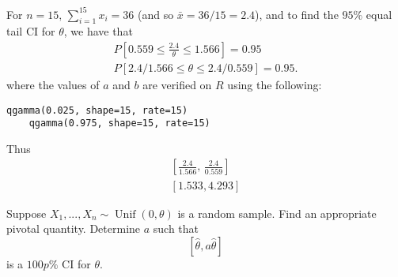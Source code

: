 \documentclass[notoc,notitlepage]{tufte-book}
\DeclareMathOperator{\Unif}{Unif }
\begin{document}
\begin{solution}
  For $n = 15, \, \sum_{i=1}^{15} x_i = 36$ (and so $\bar{x} = 36/15 = 2.4$), and to find the $95\%$ equal tail CI for $\theta$, we have that
  \begin{gather*}
    P\left[ 0.559 \leq \frac{2.4}{\theta} \leq 1.566 \right] = 0.95 \\
    P\left[ 2.4/1.566 \leq \theta \leq 2.4/0.559 \right] = 0.95.
  \end{gather*}
  where the values of $a$ and $b$ are verified on $R$ using the following:
  \begin{lstlisting}[caption=R interactive code to get $a$ and $b$]
    qgamma(0.025, shape=15, rate=15)
    qgamma(0.975, shape=15, rate=15)
  \end{lstlisting}
  Thus
  \begin{gather*}
    \left[ \frac{2.4}{1.566}, \, \frac{2.4}{0.559} \right] \\
    \left[ 1.533, 4.293 \right]
  \end{gather*}
\end{solution}

\begin{eg}
  Suppose $X_1, ..., X_n \sim \Unif(0, \theta)$ is a random sample. Find an appropriate pivotal quantity. Determine $a$ such that
  \begin{equation*}
    \left[ \hat{\theta}, a \hat{\theta} \right]
  \end{equation*}
  is a $100p\%$ CI for $\theta$.
\end{eg}
\end{document}
